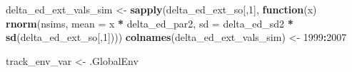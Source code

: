 \documentclass[]{article}
\newenvironment{Shaded}{\begin{snugshade}}{\end{snugshade}}
\newcommand{\ControlFlowTok}[1]{\textcolor[rgb]{0.13,0.29,0.53}{\textbf{#1}}}
\newcommand{\DataTypeTok}[1]{\textcolor[rgb]{0.13,0.29,0.53}{#1}}
\newcommand{\DecValTok}[1]{\textcolor[rgb]{0.00,0.00,0.81}{#1}}
\newcommand{\KeywordTok}[1]{\textcolor[rgb]{0.13,0.29,0.53}{\textbf{#1}}}
\newcommand{\NormalTok}[1]{#1}
\newcommand{\OperatorTok}[1]{\textcolor[rgb]{0.81,0.36,0.00}{\textbf{#1}}}
\newcommand{\StringTok}[1]{\textcolor[rgb]{0.31,0.60,0.02}{#1}}
\begin{document}
\begin{Shaded}
\begin{Highlighting}[]
\NormalTok{      delta_ed_ext_vals_sim <-}\StringTok{ }\KeywordTok{sapply}\NormalTok{(delta_ed_ext_so[,}\DecValTok{1}\NormalTok{], }\ControlFlowTok{function}\NormalTok{(x)  }\KeywordTok{rnorm}\NormalTok{(nsims, }\DataTypeTok{mean =} 
\NormalTok{                                                                                  x }\OperatorTok{*}\StringTok{ }\NormalTok{delta_ed_par2, }
                                                                                \DataTypeTok{sd =}\NormalTok{ delta_ed_sd2 }\OperatorTok{*}\StringTok{ }\KeywordTok{sd}\NormalTok{(delta_ed_ext_so[,}\DecValTok{1}\NormalTok{])))}
      \KeywordTok{colnames}\NormalTok{(delta_ed_ext_vals_sim) <-}\StringTok{ }\DecValTok{1999}\OperatorTok{:}\DecValTok{2007}
      
\NormalTok{      track_env_var <-}\StringTok{ }\NormalTok{.GlobalEnv}


\end{Highlighting}
\end{Shaded}
\end{document}
